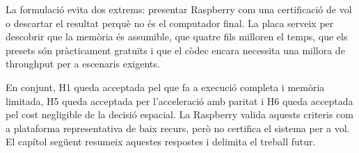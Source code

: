 La formulació evita dos extrems: presentar Raspberry com una certificació de
vol o descartar el resultat perquè no és el computador final. La placa serveix
per descobrir que la memòria és assumible, que quatre fils milloren el temps,
que els presets són pràcticament gratuïts i que el còdec encara necessita una
millora de throughput per a escenaris exigents.

En conjunt, H1 queda acceptada pel que fa a execució completa i memòria
limitada, H5 queda acceptada per l'acceleració amb paritat i H6 queda acceptada
pel cost negligible de la decisió espacial. La Raspberry valida aquests
criteris com a plataforma representativa de baix recurs, però no certifica el
sistema per a vol. El capítol següent resumeix aquestes respostes i delimita el
treball futur.
